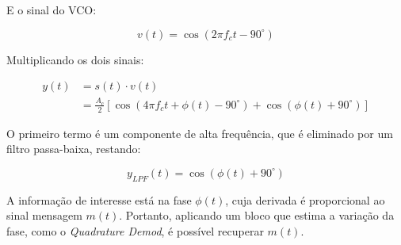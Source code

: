 E o sinal do VCO:

\begin{equation}
v(t) = \cos\left(2\pi f_c t - 90^\circ\right)
\end{equation}

Multiplicando os dois sinais:

\begin{align}
y(t) &= s(t) \cdot v(t) \\
&= \frac{A_c}{2} \left[\cos\left(4\pi f_c t + \phi(t) -90^\circ\right) + \cos\left(\phi(t) +90^\circ\right)\right]
\end{align}

O primeiro termo é um componente de alta frequência, que é eliminado por um filtro passa-baixa, restando:

\begin{equation}
y_{LPF}(t) = \cos\left(\phi(t) +90^\circ\right)
\end{equation}

A informação de interesse está na fase $\phi(t)$, cuja derivada é proporcional ao sinal mensagem $m(t)$. Portanto, aplicando um bloco que estima a variação da fase, como o \textit{Quadrature Demod}, é possível recuperar $m(t)$.


